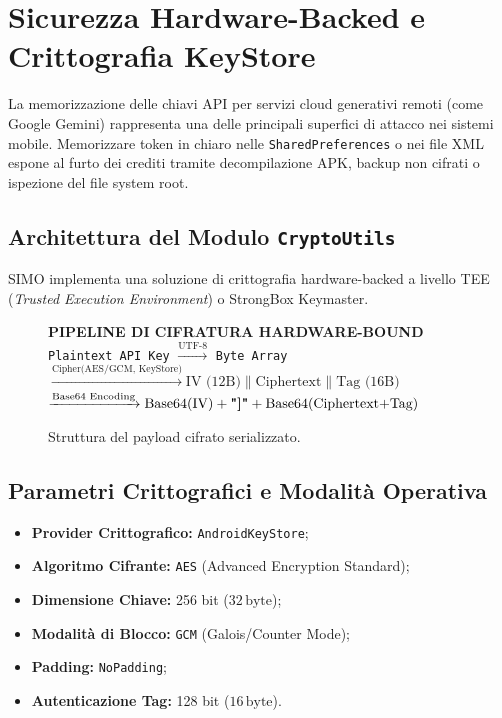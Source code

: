 \documentclass[11pt,a4paper,titlepage]{article}
\begin{document}
\section{Sicurezza Hardware-Backed e Crittografia KeyStore}
La memorizzazione delle chiavi API per servizi cloud generativi remoti (come Google Gemini) rappresenta una delle principali superfici di attacco nei sistemi mobile. Memorizzare token in chiaro nelle \texttt{SharedPreferences} o nei file XML espone al furto dei crediti tramite decompilazione APK, backup non cifrati o ispezione del file system root.

\subsection{Architettura del Modulo \texttt{CryptoUtils}}
SIMO implementa una soluzione di crittografia hardware-backed a livello TEE (\textit{Trusted Execution Environment}) o StrongBox Keymaster.

\begin{figure}[h!]
    \centering
    \begin{tcolorbox}[
        enhanced,
        colback=techLightBg,
        colframe=techNavy,
        arc=3mm,
        width=0.92\textwidth,
        boxrule=1pt,
        halign=center
    ]
        \small
        \textbf{\color{techNavy}PIPELINE DI CIFRATURA HARDWARE-BOUND}\\[0.2cm]
        \texttt{Plaintext API Key} 
        $\xrightarrow{\text{UTF-8}}$ 
        \texttt{Byte Array} 
        $\xrightarrow{\text{Cipher(AES/GCM, KeyStore)}} \text{IV (12B)} \parallel \text{Ciphertext} \parallel \text{Tag (16B)}$\\[0.15cm]
        $\xrightarrow{\text{Base64 Encoding}} \text{Base64(IV)} + \text{\textbf{"]"}} + \text{Base64(Ciphertext+Tag)}$
    \end{tcolorbox}
    \caption{Struttura del payload cifrato serializzato.}
    \label{fig:crypto_pipeline}
\end{figure}

\subsection{Parametri Crittografici e Modalit\`a Operativa}
\begin{itemize}[leftmargin=*]
    \item \textbf{Provider Crittografico:} \texttt{AndroidKeyStore};
    \item \textbf{Algoritmo Cifrante:} \texttt{AES} (Advanced Encryption Standard);
    \item \textbf{Dimensione Chiave:} 256 bit ($32\,\text{byte}$);
    \item \textbf{Modalit\`a di Blocco:} \texttt{GCM} (Galois/Counter Mode);
    \item \textbf{Padding:} \texttt{NoPadding};
    \item \textbf{Autenticazione Tag:} 128 bit ($16\,\text{byte}$).
\end{itemize}
\end{document}
